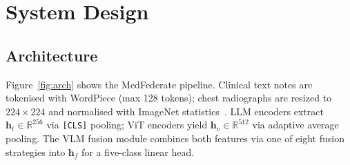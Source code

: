 \documentclass[conference]{IEEEtran}
\begin{document}
\section{System Design}

\subsection{Architecture}

Figure~\ref{fig:arch} shows the MedFederate pipeline. Clinical text
notes are tokenised with WordPiece (max 128 tokens); chest radiographs
are resized to $224{\times}224$ and normalised with ImageNet
statistics~\cite{Deng2009}. LLM encoders extract
$\mathbf{h}_t\!\in\!\mathbb{R}^{256}$ via \texttt{[CLS]} pooling;
ViT encoders yield $\mathbf{h}_v\!\in\!\mathbb{R}^{512}$ via adaptive
average pooling. The VLM fusion module combines both features via one of
eight fusion strategies into $\mathbf{h}_f$ for a five-class linear head.
\end{document}
